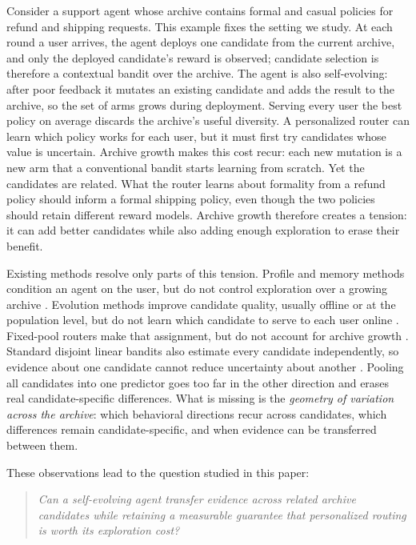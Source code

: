 \documentclass{article} %
\begin{document}
Consider a support agent whose archive contains formal and casual policies for refund and shipping requests. This example fixes the setting we study. At each round a user arrives, the agent deploys one candidate from the current archive, and only the deployed candidate's reward is observed; candidate selection is therefore a contextual bandit over the archive. The agent is also self-evolving: after poor feedback it mutates an existing candidate and adds the result to the archive, so the set of arms grows during deployment. Serving every user the best policy on average discards the archive's useful diversity. A personalized router can learn which policy works for each user, but it must first try candidates whose value is uncertain. Archive growth makes this cost recur: each new mutation is a new arm that a conventional bandit starts learning from scratch. Yet the candidates are related. What the router learns about formality from a refund policy should inform a formal shipping policy, even though the two policies should retain different reward models. Archive growth therefore creates a tension: it can add better candidates while also adding enough exploration to erase their benefit.

Existing methods resolve only parts of this tension. Profile and memory methods condition an agent on the user, but do not control exploration over a growing archive \citep{salemi2023lamp,jin2026personalizing,zhang2025personaagent,westhausser2025persistent}. Evolution methods improve candidate quality, usually offline or at the population level, but do not learn which candidate to serve to each user online \citep{fernando2023promptbreeder,guo2024evoprompt,zhou2024symbolic,agrawal2025geparp}. Fixed-pool routers make that assignment, but do not account for archive growth \citep{ong2024routellm,li2025llmbandit,tsai2026neuralucb}. Standard disjoint linear bandits also estimate every candidate independently, so evidence about one candidate cannot reduce uncertainty about another \citep{li2010contextual,chu2011linucb}. Pooling all candidates into one predictor goes too far in the other direction and erases real candidate-specific differences. What is missing is the \emph{geometry of variation across the archive}: which behavioral directions recur across candidates, which differences remain candidate-specific, and when evidence can be transferred between them.

These observations lead to the question studied in this paper:
\begin{quote}
\emph{Can a self-evolving agent transfer evidence across related archive candidates while retaining a measurable guarantee that personalized routing is worth its exploration cost?}
\end{quote}
\end{document}
